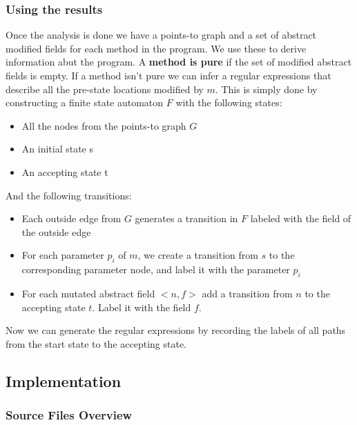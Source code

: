 \documentclass[11pt]{exam}
\begin{document}
\subsubsection*{Using the results}

Once the analysis is done we have a points-to graph and a set of
abstract modified fields for each method in the program. We use these
to derive information abut the program. A \textbf{method is pure} if
the set of modified abstract fields is empty. If a method isn't pure
we can infer a regular expressions that describe all the pre-state
locations modified by $m$. This  is simply done by constructing a
finite state automaton $F$ with the following states:

\begin{itemize}
  \setlength{\itemsep}{1pt}
  \setlength{\parskip}{0pt}
  \item All the nodes from the points-to graph $G$
  \item An initial state s
  \item An accepting state t
\end{itemize}

And the following transitions: 

\begin{itemize}
  \setlength{\itemsep}{1pt}
  \setlength{\parskip}{0pt}
  \item Each outside edge from $G$ generates a transition in $F$ labeled with 
        the field of the outside edge
  \item For each parameter $p_i$ of $m$, we create a transition from $s$ to 
        the corresponding parameter node, and label it with the parameter $p_i$
  \item For each mutated abstract field $<n,f>$ add a transition from $n$ to the 
        accepting state $t$. Label it with the field $f$.
\end{itemize}

Now we can generate the regular expressions by recording the labels of
all paths from the start state to the accepting state.

\subsection{Implementation}

\subsubsection*{Source Files Overview}
\end{document}
